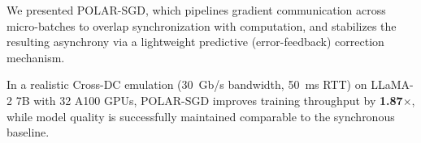 \label{conclusion}

We presented POLAR-SGD, which pipelines gradient communication across micro-batches to overlap synchronization with computation, and stabilizes the resulting asynchrony via a lightweight predictive (error-feedback) correction mechanism.

In a realistic Cross-DC emulation (30~Gb/s bandwidth, 50~ms RTT) on LLaMA-2 7B with 32 A100 GPUs, POLAR-SGD improves training throughput by \textbf{1.87$\times$}, while model quality is successfully maintained comparable to the synchronous baseline.

